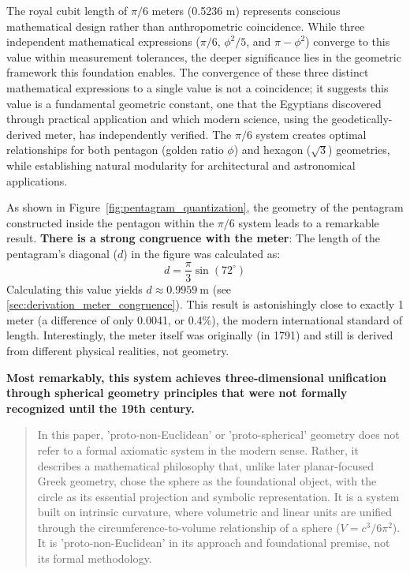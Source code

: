 \documentclass[11pt]{article}
\begin{document}
The royal cubit length of $\pi/6$ meters (0.5236 m) represents conscious mathematical design rather than anthropometric coincidence. While three independent mathematical expressions ($\pi/6$, $\phi^2/5$, and $\pi - \phi^2$) converge to this value within measurement tolerances, the deeper significance lies in the geometric framework this foundation enables. The convergence of these three distinct mathematical expressions to a single value is not a coincidence; it suggests this value is a fundamental geometric constant, one that the Egyptians discovered through practical application and which modern science, using the geodetically-derived meter, has independently verified. The $\pi/6$ system creates optimal relationships for both pentagon (golden ratio $\phi$) and hexagon ($\sqrt{3}$) geometries, while establishing natural modularity for architectural and astronomical applications.

As shown in Figure~\ref{fig:pentagram_quantization}, the geometry of the pentagram constructed inside the pentagon within the $\pi/6$ system leads to a remarkable result. 
\textbf{There is a strong congruence with the meter}: The length of the pentagram's diagonal ($d$) in the figure was calculated as:
\[
d = \frac{\pi}{3} \sin(72^\circ)
\]
Calculating this value yields $d \approx \SI{0.9959}{\meter}$ (see \ref{sec:derivation_meter_congruence}). This result is astonishingly close to exactly 1 meter (a difference of only 0.0041, or 0.4\%), the modern international standard of length. Interestingly, the meter itself was originally (in 1791) and still is derived from different physical realities, not geometry.

\textbf{Most remarkably, this system achieves three-dimensional unification through spherical geometry principles that were not formally recognized until the 19th century.}
\begin{quote}
In this paper, 'proto-non-Euclidean' or 'proto-spherical' geometry does not refer to a formal axiomatic system in the modern sense. Rather, it describes a mathematical philosophy that, unlike later planar-focused Greek geometry, chose the sphere as the foundational object, with the circle as its essential projection and symbolic representation. It is a system built on intrinsic curvature, where volumetric and linear units are unified through the circumference-to-volume relationship of a sphere ($V = c^3/6\pi^2$). It is 'proto-non-Euclidean' in its approach and foundational premise, not its formal methodology.
\end{quote}
\end{document}
